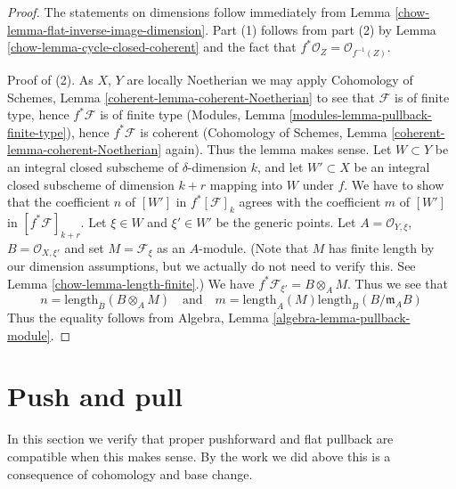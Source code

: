 \begin{proof}

The statements on dimensions follow immediately from
Lemma \ref{chow-lemma-flat-inverse-image-dimension}.
Part (1) follows from part (2) by Lemma \ref{chow-lemma-cycle-closed-coherent}
and the fact that $f^*\mathcal{O}_Z = \mathcal{O}_{f^{-1}(Z)}$.

\medskip\noindent
Proof of (2).
As $X$, $Y$ are locally Noetherian we may apply
Cohomology of Schemes, Lemma \ref{coherent-lemma-coherent-Noetherian} to see
that $\mathcal{F}$ is of finite type, hence $f^*\mathcal{F}$ is
of finite type (Modules, Lemma \ref{modules-lemma-pullback-finite-type}),
hence $f^*\mathcal{F}$ is coherent
(Cohomology of Schemes, Lemma \ref{coherent-lemma-coherent-Noetherian} again).
Thus the lemma makes sense. Let $W \subset Y$ be an integral closed
subscheme of $\delta$-dimension $k$, and let $W' \subset X$ be
an integral closed subscheme of dimension $k + r$ mapping into $W$
under $f$. We have to show that the coefficient $n$ of
$[W']$ in $f^*[{\mathcal F}]_k$ agrees with the coefficient
$m$ of $[W']$ in $[f^*{\mathcal F}]_{k+r}$. Let $\xi \in W$ and
$\xi' \in W'$ be the generic points. Let
$A = \mathcal{O}_{Y, \xi}$, $B = \mathcal{O}_{X, \xi'}$
and set $M = \mathcal{F}_\xi$ as an $A$-module. (Note that
$M$ has finite length by our dimension assumptions, but we
actually do not need to verify this. See
Lemma \ref{chow-lemma-length-finite}.)
We have $f^*\mathcal{F}_{\xi'} = B \otimes_A M$.
Thus we see that
$$
n = \text{length}_B(B \otimes_A M)
\quad
\text{and}
\quad
m = \text{length}_A(M) \text{length}_B(B/\mathfrak m_AB)
$$
Thus the equality follows from
Algebra, Lemma \ref{algebra-lemma-pullback-module}.
\end{proof}

\section{Push and pull}
\label{chow-section-push-pull}
In this section we verify that proper pushforward and flat pullback
are compatible when this makes sense. By the work we did above this
is a consequence of cohomology and base change.

